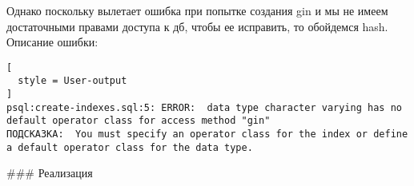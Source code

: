 Однако поскольку вылетает ошибка при попытке создания gin и мы не имеем достаточными правами доступа к дб, чтобы ее исправить, то обойдемся hash. Описание ошибки:

\begin{lstlisting}[
  style = User-output
]
psql:create-indexes.sql:5: ERROR:  data type character varying has no default operator class for access method "gin"
ПОДСКАЗКА:  You must specify an operator class for the index or define a default operator class for the data type.
\end{lstlisting}

\begin{markdown}
### Реализация
\end{markdown}


